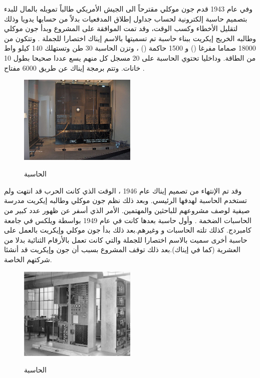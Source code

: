 \documentclass[document.tex]{subfiles}
\begin{document}
وفي عام 1943 قدم جون موكلي  مقترحاً الى الجيش الأمريكي طالباً تمويله بالمال للبدء بتصميم حاسبة إلكترونية لحساب جداول إطلاق المدفعيات بدلاً من حسابها يدويا وذلك لتقليل الأخطاء وكسب الوقت، وقد تمت الموافقة على المشروع وبدأ جون موكلي وطالبه الخريج إيكريت ببناء حاسبة تم تسميتها بالاسم إيناك  اختصارا للجملة . وتتكون من 18000 صماما مفرغا () و 1500 حاكمة () ، وتزن الحاسبة 30 طن وتستهلك 140 كيلو واط من الطاقة. وداخليا تحتوي الحاسبة على 20 مسجل كل منهم يسع عددا صحيحا بطول 10 خانات. وتتم برمجة إيناك عن طريق 6000 مفتاح .

\begin{figure}[h!] 
  \caption{الحاسبة }
  \centering
   \includegraphics[width=0.5\textwidth]{../img/ENIAC}
 \label{fig:ENIAC} 
\end{figure}

وقد تم الإنتهاء من تصميم إيناك عام 1946 ، الوقت الذي كانت الحرب قد انتهت ولم تستخدم الحاسبة لهدفها الرئيسي. وبعد ذلك نظم جون موكلي وطالبه إيكريت مدرسة صيفية لوصف مشروعهم للباحثين والمهتمين. الأمر الذي أسفر عن ظهور عدد كبير من الحاسبات الضخمة . وأول حاسبة بعدها كانت  في عام 1949 بواسطة ويلكس في جامعة كامبردج. كذلك تلته الحاسبات  و  وغيرهم.بعد ذلك بدأ جون موكلي وإيكريت بالعمل على حاسبة أخرى سميت بالاسم  اختصارا للجملة  والتي كانت تعمل بالأرقام الثنائية بدلا من العشرية (كما في إيناك).بعد ذلك توقف المشروع بسبب أن جون وإيكريت قد أنشئا شركتهم الخاصة.
 
\begin{figure}[h!] 
  \caption{الحاسبة }
  \centering
   \includegraphics[width=0.5\textwidth]{../img/edvac}
 \label{fig:edvac} 
\end{figure}
\end{document}
